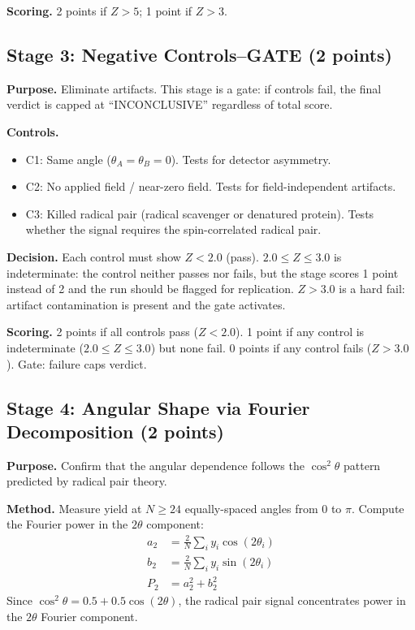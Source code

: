 \documentclass[preprint,amsmath,amssymb]{revtex4-2}
\begin{document}
\textbf{Scoring.} 2 points if $Z > 5$; 1 point if $Z > 3$.

\subsection{Stage 3: Negative Controls--GATE (2 points)}

\textbf{Purpose.} Eliminate artifacts. This stage is a gate: if controls fail, the final verdict is capped at ``INCONCLUSIVE'' regardless of total score.

\textbf{Controls.}
\begin{itemize}
\item C1: Same angle ($\theta_A = \theta_B = 0$). Tests for detector asymmetry.
\item C2: No applied field / near-zero field. Tests for field-independent artifacts.
\item C3: Killed radical pair (radical scavenger or denatured protein). Tests whether the signal requires the spin-correlated radical pair.
\end{itemize}

\textbf{Decision.} Each control must show $Z < 2.0$ (pass). $2.0 \leq Z \leq 3.0$ is indeterminate: the control neither passes nor fails, but the stage scores 1 point instead of 2 and the run should be flagged for replication. $Z > 3.0$ is a hard fail: artifact contamination is present and the gate activates.

\textbf{Scoring.} 2 points if all controls pass ($Z < 2.0$). 1 point if any control is indeterminate ($2.0 \leq Z \leq 3.0$) but none fail. 0 points if any control fails ($Z > 3.0$). Gate: failure caps verdict.

\subsection{Stage 4: Angular Shape via Fourier Decomposition (2 points)}

\textbf{Purpose.} Confirm that the angular dependence follows the $\cos^2\theta$ pattern predicted by radical pair theory.

\textbf{Method.} Measure yield at $N \geq 24$ equally-spaced angles from 0 to $\pi$. Compute the Fourier power in the $2\theta$ component:
\begin{align}
a_2 &= \frac{2}{N} \sum_i y_i \cos(2\theta_i) \\
b_2 &= \frac{2}{N} \sum_i y_i \sin(2\theta_i) \\
P_2 &= a_2^2 + b_2^2
\end{align}
Since $\cos^2\theta = 0.5 + 0.5\cos(2\theta)$, the radical pair signal concentrates power in the $2\theta$ Fourier component.
\end{document}
